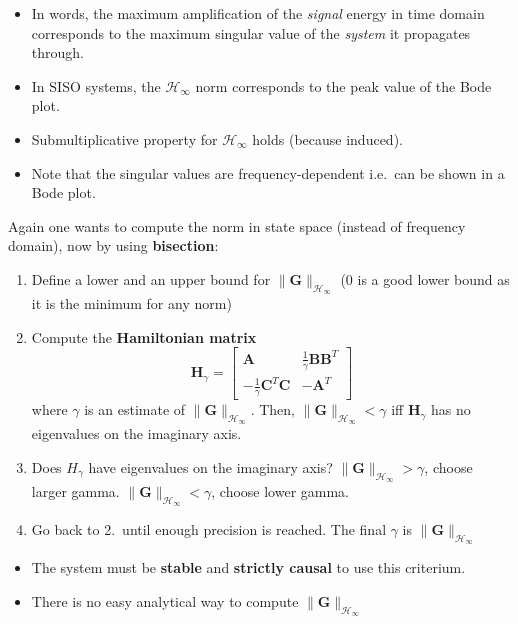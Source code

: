 \newpar{}

\begin{itemize}
    \item In words, the maximum amplification of the \textit{signal} energy in time domain corresponds to the maximum singular value of the \textit{system} it propagates through.   %
    \item In SISO systems, the $\mathcal{H}_\infty$ norm corresponds to the peak value of the Bode plot.    %
    \item Submultiplicative property for $\mathcal{H}_\infty$ holds (because induced).
    \item Note that the singular values are frequency-dependent i.e.\ can be shown in a Bode plot.
\end{itemize}

\newpar{}

Again one wants to compute the norm in state space (instead of frequency domain), now by using \textbf{bisection}:
\begin{enumerate}
    \item Define a lower and an upper bound for $\|\mathbf{G}\|_{\mathcal{H}_{\infty}}$ (0 is a good lower bound as it is the minimum for any norm)
    \item Compute the \textbf{Hamiltonian matrix}
          \begin{equation*}
              \mathbf{H}_{\gamma}=
              \begin{bmatrix}
                  \mathbf{A}                                & \frac{1}{\gamma}\mathbf{BB}^{T} \\
                  -\frac{1}{\gamma}\mathbf{C}^{T}\mathbf{C} & -\mathbf{A}^{T}
              \end{bmatrix}
          \end{equation*}
          where $\gamma$ is an estimate of $\|\mathbf{G}\|_{\mathcal{H}_{\infty}}$. Then, $\|\mathbf{G}\|_{\mathcal{H}_{\infty}}<\gamma$ iff $\mathbf{H}_{\gamma}$ has no eigenvalues on the imaginary axis.
    \item Does $H_{\gamma}$ have eigenvalues on the imaginary axis?
           $\|\mathbf{G}\|_{\mathcal{H}_{\infty}}>\gamma$, choose larger gamma.
           $\|\mathbf{G}\|_{\mathcal{H}_{\infty}}<\gamma$, choose lower gamma.
    \item Go back to 2.\ until enough precision is reached. The final $\gamma$ is $\|\mathbf{G}\|_{\mathcal{H}_{\infty}}$
\end{enumerate}


\begin{itemize}
    \item The system must be \textbf{stable} and \textbf{strictly causal} to use this criterium.
    \item There is no easy analytical way to compute $\|\mathbf{G}\|_{\mathcal{H}_{\infty}}$
\end{itemize}